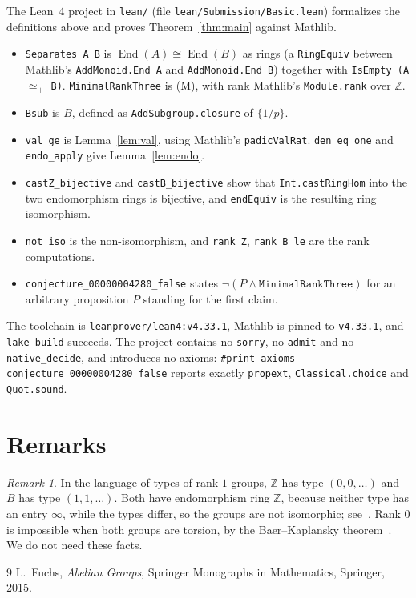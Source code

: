 \documentclass[11pt]{article}
\theoremstyle{plain}
\theoremstyle{definition}
\theoremstyle{remark}
\newtheorem{remark}[theorem]{Remark}
\newcommand{\Z}{\mathbb Z}
\newcommand{\End}{\operatorname{End}}
\begin{document}
\sloppy
The Lean~4 project in \texttt{lean/} (file \texttt{lean/Submission/Basic.lean})
formalizes the definitions above and proves Theorem~\ref{thm:main} against Mathlib.
\begin{itemize}
  \item \texttt{Separates A B} is $\End(A)\cong\End(B)$ as rings (a
    \texttt{RingEquiv} between Mathlib's \texttt{AddMonoid.End A} and
    \texttt{AddMonoid.End B}) together with \texttt{IsEmpty (A} $\simeq_+$
    \texttt{B)}. \texttt{MinimalRankThree} is (M), with rank Mathlib's
    \texttt{Module.rank} over $\Z$.
  \item \texttt{Bsub} is $B$, defined as \texttt{AddSubgroup.closure} of
    $\{1/p\}$.
  \item \texttt{val\_ge} is Lemma~\ref{lem:val}, using Mathlib's
    \texttt{padicValRat}. \texttt{den\_eq\_one} and \texttt{endo\_apply} give
    Lemma~\ref{lem:endo}.
  \item \texttt{castZ\_bijective} and \texttt{castB\_bijective} show that
    \texttt{Int.castRingHom} into the two endomorphism rings is bijective, and
    \texttt{endEquiv} is the resulting ring isomorphism.
  \item \texttt{not\_iso} is the non-isomorphism, and \texttt{rank\_Z},
    \texttt{rank\_B\_le} are the rank computations.
  \item \texttt{conjecture\_00000004280\_false} states
    $\lnot(P\wedge\texttt{MinimalRankThree})$ for an arbitrary proposition $P$
    standing for the first claim.
\end{itemize}
The toolchain is \texttt{leanprover/lean4:v4.33.1}, Mathlib is pinned to
\texttt{v4.33.1}, and \texttt{lake build} succeeds. The project contains no
\texttt{sorry}, no \texttt{admit} and no \texttt{native\_decide}, and introduces no
axioms: \texttt{\#print axioms conjecture\_00000004280\_false} reports exactly
\texttt{propext}, \texttt{Classical.choice} and \texttt{Quot.sound}.

\fussy
\section{Remarks}

\begin{remark}
In the language of types of rank-$1$ groups, $\Z$ has type $(0,0,\dots)$ and $B$ has
type $(1,1,\dots)$. Both have endomorphism ring $\Z$, because neither type has an
entry $\infty$, while the types differ, so the groups are not isomorphic;
see~\cite{fuchs}. Rank $0$ is impossible when both groups are torsion, by the
Baer--Kaplansky theorem~\cite{fuchs}. We do not need these facts.
\end{remark}

\begin{thebibliography}{9}
 L.~Fuchs, \emph{Abelian Groups}, Springer Monographs in
  Mathematics, Springer, 2015.
\end{thebibliography}
\end{document}
